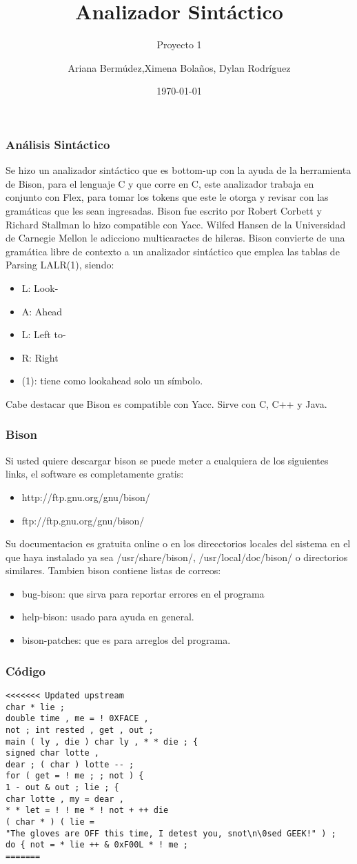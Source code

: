 \documentclass{beamer}
\title{Analizador Sint\'actico}
\subtitle{Proyecto 1}
\author{Ariana Berm\'udez,Ximena Bola\~nos, Dylan Rodr\'iguez}
\institute{Instituto Tecnol\'ogico de Costa Rica}
\date{\today}
\begin{document}
\begin{frame}
 \titlepage 
 \end{frame}\begin{frame}
 \frametitle{An\'alisis Sint\'actico}
  Se hizo un analizador sint\'actico que es bottom-up con la ayuda de la herramienta de Bison, para el lenguaje C y que corre en C, este analizador trabaja en conjunto con Flex, para tomar los tokens que este le otorga y revisar con las gram\'aticas que les sean ingresadas. Bison fue escrito por Robert Corbett y Richard Stallman lo hizo compatible con Yacc. Wilfed Hansen de la Universidad de Carnegie Mellon le adicciono multicaractes de hileras. Bison convierte de una gram\'atica libre de contexto a un analizador sint\'actico que emplea las tablas de Parsing LALR(1), siendo: \begin{itemize} \item L: Look- \item A: Ahead \item L: Left to- \item R: Right \item (1): tiene como lookahead solo un s\'imbolo. \end{itemize} Cabe destacar que Bison es compatible con Yacc. Sirve con C, C++ y Java. \end{frame}\begin{frame}
 \frametitle{Bison}
  Si usted quiere descargar bison se puede meter a cualquiera de los siguientes links, el software es completamente gratis: \begin{itemize} \item http://ftp.gnu.org/gnu/bison/ \item ftp://ftp.gnu.org/gnu/bison/ \end{itemize} Su documentacion es gratuita online  o en los direcctorios locales del sistema en el que haya instalado ya sea /usr/share/bison/, /usr/local/doc/bison/ o directorios similares. Tambien bison contiene listas de correos: \begin{itemize} \item bug-bison: que sirva para reportar errores en el programa \item help-bison: usado para ayuda en general. \item bison-patches: que es para arreglos del programa. \end{itemize} \end{frame} \begin{frame}[fragile]
\frametitle{C\'odigo}
\begin{verbatim}
<<<<<<< Updated upstream
char * lie ; 
double time , me = ! 0XFACE , 
not ; int rested , get , out ; 
main ( ly , die ) char ly , * * die ; { 
signed char lotte , 
dear ; ( char ) lotte -- ; 
for ( get = ! me ; ; not ) { 
1 - out & out ; lie ; { 
char lotte , my = dear , 
* * let = ! ! me * ! not + ++ die 
( char * ) ( lie = 
"The gloves are OFF this time, I detest you, snot\n\0sed GEEK!" ) ; 
do { not = * lie ++ & 0xF00L * ! me ; 
=======


\end{verbatim}
\end{frame}
\end{document}
